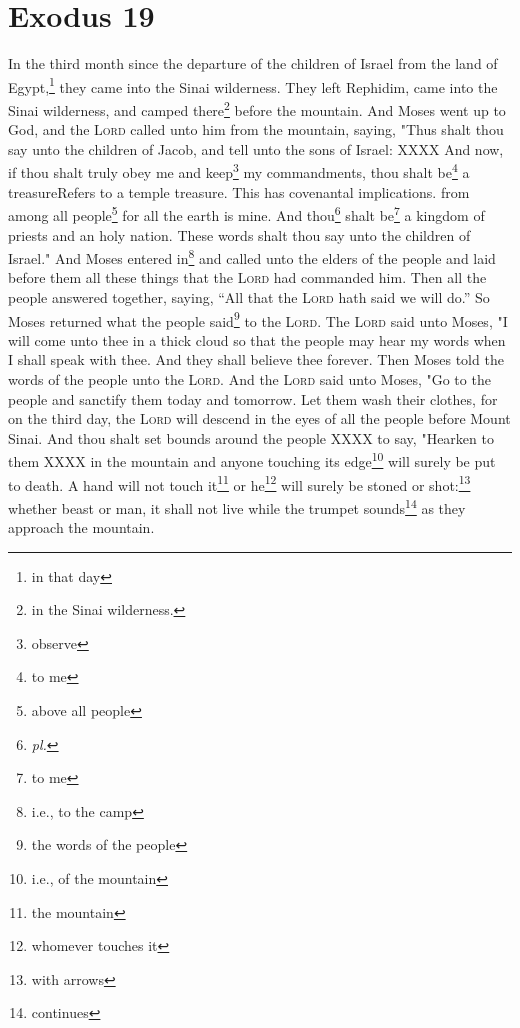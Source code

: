 \section{Exodus 19}\label{exodus:19}
\begin{enumerate}[align=center]
     In the third month since the departure of the children of Israel from the land of Egypt,\footnote{in that day} they came into the Sinai wilderness.%
     They left Rephidim, came into the Sinai wilderness, and camped there\footnote{in the Sinai wilderness.} before the mountain.%
     And Moses went up to God, and the \textsc{Lord} called unto him from the mountain, saying, "Thus shalt thou say unto the children of Jacob, and tell unto the sons of Israel:%
     XXXX%
     And now, if thou shalt truly obey me and keep\footnote{observe} my commandments, thou shalt be\footnote{to me} a treasure{Refers to a temple treasure. This has covenantal implications.} from among all people\footnote{above all people} for all the earth is mine.%
     And thou\footnote{\emph{pl.}} shalt be\footnote{to me} a kingdom of priests and an holy nation. These words shalt thou say unto the children of Israel."%
     And Moses entered in\footnote{i.e., to the camp} and called unto the elders of the people and laid before them all these things that the \textsc{Lord} had commanded him.%
     Then all the people answered together, saying, ``All that the \textsc{Lord} hath said we will do.'' So Moses returned what the people said\footnote{the words of the people} to the \textsc{Lord}.%
     The \textsc{Lord} said unto Moses, "I will come unto thee in a thick cloud so that the people may hear my words when I shall speak with thee. And they shall believe thee forever. Then Moses told the words of the people unto the \textsc{Lord}.%
     And the \textsc{Lord} said unto Moses, "Go to the people and sanctify them today and tomorrow. Let them wash their clothes,%
     for on the third day, the \textsc{Lord} will descend in the eyes of all the people before Mount Sinai.%
     And thou shalt set bounds around the people XXXX to say, "Hearken to them XXXX in the mountain and anyone touching its edge\footnote{i.e., of the mountain} will surely be put to death.%
     A hand will not touch it\footnote{the mountain} or he\footnote{whomever touches it} will surely be stoned or shot:\footnote{with arrows} whether beast or man, it shall not live while the trumpet sounds\footnote{continues} as they approach the mountain.%

\end{enumerate}
